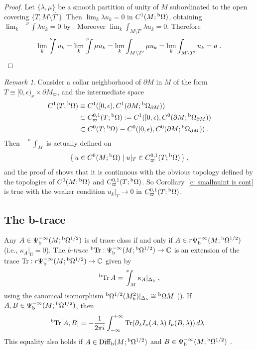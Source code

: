 \documentclass{memo-l}
\theoremstyle{plain}
\theoremstyle{definition}
\theoremstyle{remark}
\newtheorem{rem}[thm]{Remark}
\newcommand{\C}{\mathbb{C}}
\newcommand{\Tr}{\operatorname{Tr}}
\newcommand{\Diff}{\operatorname{Diff}}
\newcommand{\ff}{\operatorname{ff}}
\newcommand{\bTr}{{}^{\text{\rm b}}\!\Tr}
\newcommand{\bOmega}{{}^{\text{\rm b}}\Omega}
\newcommand{\Psib}{\Psi_{\text{\rm b}}}
\newcommand{\Diffb}{\Diff_{\text{\rm b}}}
\newcommand{\Deltab}{\Delta_{\text{\rm b}}}
\newcommand{\nuint}{\!\!\!\!\!{\phantom{\int}}^\nu\!\!\!\!\int}
\newcommand{\smallnuint}{\!\!\!{\phantom{\int}}^\nu\!\!\!\int}
\numberwithin{section}{chapter}
\numberwithin{equation}{section}%
\begin{document}
\begin{proof}
Let $\{\lambda,\mu\}$ be a smooth partition of unity of $M$ subordinated to the open covering $\{T,M\setminus\overline{T'}\}$. Then $\lim_k\lambda u_k=0$ in $C^1(M;\bOmega)$, obtaining $\lim_k\smallnuint\lambda u_k=0$ by . Moreover $\lim_k\int_{M\setminus T'}\lambda u_k=0$. Therefore
\[
\lim_k\nuint u_k=\lim_k\nuint\mu u_k=\lim_k\int_{M\setminus T'}\mu u_k
=\lim_k\int_{M\setminus T'}u_k=a\;.\qedhere
\]
\end{proof}

\begin{rem}\label{r: smallnuint is cont}
Consider a collar neighborhood of $\partial M$ in $M$ of the form $T\equiv[0,\epsilon)_x\times\partial M_\varpi$, and the intermediate space
\begin{align*}
C^1(T;\bOmega)&\equiv C^1([0,\epsilon),C^1(\partial M;\bOmega_{\partial M}))\\
&\subset C^{0,1}_\varpi(T;\bOmega):=C^1([0,\epsilon),C^0(\partial M;\bOmega_{\partial M}))\\
&\subset C^0(T;\bOmega)\equiv C^0([0,\epsilon),C^0(\partial M;\bOmega_{\partial M}))\;.
\end{align*}
Then $\smallnuint_M$ is actually defined on
\[
\{\,u\in C^0(M;\bOmega)\mid u|_T\in C^{0,1}_\varpi(T;\bOmega)\,\}\;,
\]
and the proof of  shows that it is continuous with the obvious topology defined by the topologies of $C^0(M;\bOmega)$ and $C^{0,1}_\varpi(T;\bOmega)$. So Corollary~\ref{c: smallnuint is cont} is true with the weaker condition $u_k|_T\to0$ in $C^{0,1}_\varpi(T;\bOmega)$.
\end{rem}

\subsection{The b-trace}\label{ss: b-trace}

Any $A\in\Psib^{-\infty}(M;\bOmega^{1/2})$ is of trace class  if and only if $A\in r\Psib^{-\infty}(M;\bOmega^{1/2})$ (i.e., $\kappa_A|_{\ff}=0$). The \emph{b-trace} $\bTr:\Psib^{-\infty}(M;\bOmega^{1/2})\to\C$ is an extension of the trace $\Tr:r\Psib^{-\infty}(M;\bOmega^{1/2})\to\C$ given by  \index{$\bTr$}
\[
\bTr A=\nuint_M\kappa_A|_{\Deltab}\;,
\]
using the canonical isomorphism $\bOmega^{1/2}(M^2_{\text{\rm b}})|_{\Deltab}\cong\bOmega M$ (). If $A,B\in\Psi^{-\infty}_{\text{\rm b}}(M;\bOmega^{1/2})$, then \cite[Proposition 5.9]{Melrose1993}
\begin{equation}\label{bTr[A,B]}
\bTr[A,B]=-\frac{1}{2\pi i} \int_{-\infty}^{+\infty}\Tr(\partial_{\lambda}I_\nu(A,\lambda)\, I_\nu(B,\lambda))\,d\lambda\;.
\end{equation}
This equality also holds if $A\in\Diffb(M;\bOmega^{1/2})$ and $B\in\Psib^{-\infty}(M;\bOmega^{1/2})$ \cite[Lemma 5.10]{Melrose1993}.
\end{document}
